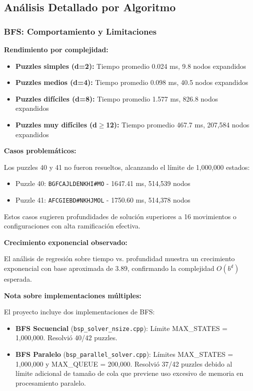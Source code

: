 \documentclass[12pt,a4paper]{article}
\begin{document}
\subsection{Análisis Detallado por Algoritmo}

\subsubsection{BFS: Comportamiento y Limitaciones}

\textbf{Rendimiento por complejidad:}
\begin{itemize}
    \item \textbf{Puzzles simples (d=2):} Tiempo promedio 0.024 ms, 9.8 nodos expandidos
    \item \textbf{Puzzles medios (d=4):} Tiempo promedio 0.098 ms, 40.5 nodos expandidos
    \item \textbf{Puzzles difíciles (d=8):} Tiempo promedio 1.577 ms, 826.8 nodos expandidos
    \item \textbf{Puzzles muy difíciles (d$\geq$12):} Tiempo promedio 467.7 ms, 207,584 nodos expandidos
\end{itemize}

\textbf{Casos problemáticos:}

Los puzzles 40 y 41 no fueron resueltos, alcanzando el límite de 1,000,000 estados:
\begin{itemize}
    \item Puzzle 40: \texttt{BGFCAJLDENKHI\#MO} - 1647.41 ms, 514,539 nodos
    \item Puzzle 41: \texttt{AFCGIEBD\#NKHJMOL} - 1750.60 ms, 514,378 nodos
\end{itemize}

Estos casos sugieren profundidades de solución superiores a 16 movimientos o configuraciones con alta ramificación efectiva.

\textbf{Crecimiento exponencial observado:}

El análisis de regresión sobre tiempo vs. profundidad muestra un crecimiento exponencial con base aproximada de 3.89, confirmando la complejidad $O(b^d)$ esperada.

\textbf{Nota sobre implementaciones múltiples:}

El proyecto incluye dos implementaciones de BFS:
\begin{itemize}
    \item \textbf{BFS Secuencial} (\texttt{bsp\_solver\_nsize.cpp}): Límite MAX\_STATES = 1,000,000. Resolvió 40/42 puzzles.
    \item \textbf{BFS Paralelo} (\texttt{bsp\_parallel\_solver.cpp}): Límites MAX\_STATES = 1,000,000 y MAX\_QUEUE = 200,000. Resolvió 37/42 puzzles debido al límite adicional de tamaño de cola que previene uso excesivo de memoria en procesamiento paralelo.
\end{itemize}
\end{document}
